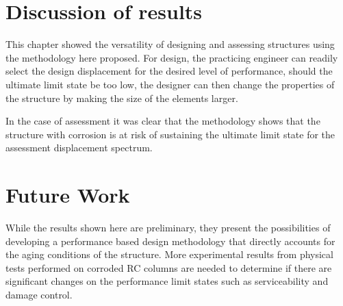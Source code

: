 \section{Discussion of results}

This chapter showed the versatility of designing and assessing structures using the methodology here proposed. For design, the practicing engineer can readily select the design displacement for the desired level of performance, should the ultimate limit state be too low, the designer can then change the properties of the structure by making the size of the elements larger. 

In the case of assessment it was clear that the methodology shows that the structure with corrosion is at risk of sustaining the ultimate limit state for the assessment displacement spectrum.

\section{Future Work}

While the results shown here are preliminary, they present the possibilities of developing a performance based design methodology that directly accounts for the aging conditions of the structure. More experimental results from physical tests performed on corroded RC columns are needed to determine if there are significant changes on the performance limit states such as serviceability and damage control.